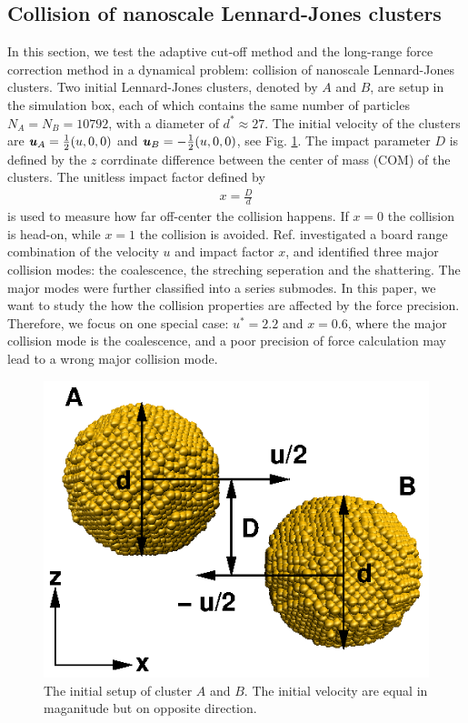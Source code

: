 \documentclass[aps,pre,preprint]{revtex4-1}
\renewcommand{\v}[1]{\textbf{\textit{#1}}}
\begin{document}
\subsection{Collision of nanoscale Lennard-Jones clusters}
\label{sec:tmp2.2}

In this section, we test the adaptive cut-off method and the long-range force
correction method in a dynamical problem: collision of nanoscale
Lennard-Jones clusters. Two initial Lennard-Jones clusters, denoted by
$A$ and $B$, are setup in the simulation box, each of which contains
the same number of particles $N_A = N_B = 10792$, with a diameter of
$d^\ast\approx 27$. The initial velocity of the clusters are $\v u_A =
\frac12(u, 0, 0)$ and $\v u_B = -\frac12(u, 0, 0)$, see
Fig. \ref{fig:tmp7}. The impact parameter $D$ is defined by the $z$
corrdinate difference between the center of mass (COM) of the
clusters. The unitless impact factor defined by
\begin{align}
  x = \frac D d
\end{align}
is used to measure how far off-center the collision happens. If $x =
0$ the collision is head-on, while $x=1$ the collision is avoided.
Ref. \cite{kalweit2006collision} investigated a board range
combination of the velocity $u$ and impact factor $x$, and identified
three major collision modes: the coalescence, the streching seperation
and the shattering. The major modes were further classified into a
series submodes. In this paper, we want to study the how the collision
properties are affected by the force 
precision. Therefore, we focus on one special case: $u^\ast = 2.2$ and
$x = 0.6$, where the major collision mode is the coalescence, and a
poor precision of force calculation may lead to a wrong major
collision mode.

\begin{figure}
  \centering
  \includegraphics[]{fig/collision-init/init.2.eps}
  \caption{The initial setup of cluster $A$ and $B$. The initial
    velocity are equal in maganitude but on opposite direction.}
  \label{fig:tmp7}
\end{figure}
\end{document}
